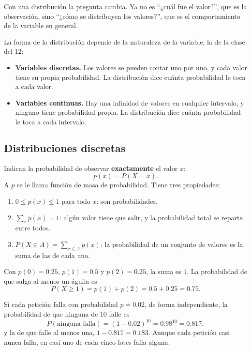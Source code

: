 \documentclass[11pt,letterpaper]{article}
\begin{document}
Con una distribución la pregunta cambia. Ya no es ``¿cuál fue el
valor?'', que es la observación, sino ``¿cómo se distribuyen los
valores?'', que es el comportamiento de la variable en general.

La forma de la distribución depende de la naturaleza de la variable,
la de la clase del $12$:

\begin{itemize}[itemsep=0.3em]
    \item \textbf{Variables discretas.} Los valores se pueden contar
          uno por uno, y cada valor tiene su propia probabilidad. La
          distribución dice cuánta probabilidad le toca a cada valor.
    \item \textbf{Variables continuas.} Hay una infinidad de valores en
          cualquier intervalo, y ninguno tiene probabilidad propia. La
          distribución dice cuánta probabilidad le toca a cada
          intervalo.
\end{itemize}


\subsection*{Distribuciones discretas}

Indican la probabilidad de observar \textbf{exactamente} el valor $x$:
\[
    p(x) = P(X = x) .
\]
A $p$ se le llama función de masa de probabilidad. Tiene tres
propiedades:

\begin{enumerate}[itemsep=0.3em]
    \item $0 \le p(x) \le 1$ para todo $x$: son probabilidades.
    \item $\sum_{x} p(x) = 1$: algún valor tiene que salir, y la
          probabilidad total se reparte entre todos.
    \item $P(X \in A) = \sum_{x \in A} p(x)$: la probabilidad de un
          conjunto de valores es la suma de las de cada uno.
\end{enumerate}

\begin{ejemplo}
    Con $p(0) = 0.25$, $p(1) = 0.5$ y $p(2) = 0.25$, la suma es $1$. La
    probabilidad de que salga al menos un águila es
    \[
        P(X \ge 1) = p(1) + p(2) = 0.5 + 0.25 = 0.75 .
    \]
\end{ejemplo}

\begin{ejemplo}
    Si cada petición falla con probabilidad $p = 0.02$, de forma
    independiente, la probabilidad de que ninguna de $10$ falle es
    \[
        P(\text{ninguna falla}) = (1 - 0.02)^{10} = 0.98^{10} = 0.817 ,
    \]
    y la de que falle al menos una, $1 - 0.817 = 0.183$. Aunque cada
    petición casi nunca falla, en casi uno de cada cinco lotes falla
    alguna.
\end{ejemplo}
\end{document}
